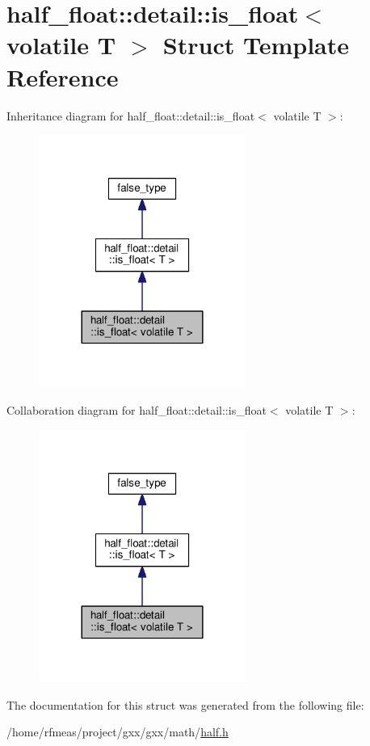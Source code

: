 \hypertarget{structhalf__float_1_1detail_1_1is__float_3_01volatile_01T_01_4}{}\section{half\+\_\+float\+:\+:detail\+:\+:is\+\_\+float$<$ volatile T $>$ Struct Template Reference}
\label{structhalf__float_1_1detail_1_1is__float_3_01volatile_01T_01_4}


Inheritance diagram for half\+\_\+float\+:\+:detail\+:\+:is\+\_\+float$<$ volatile T $>$\+:
\nopagebreak
\begin{figure}[H]
\begin{center}
\leavevmode
\includegraphics[width=192pt]{structhalf__float_1_1detail_1_1is__float_3_01volatile_01T_01_4__inherit__graph}
\end{center}
\end{figure}


Collaboration diagram for half\+\_\+float\+:\+:detail\+:\+:is\+\_\+float$<$ volatile T $>$\+:
\nopagebreak
\begin{figure}[H]
\begin{center}
\leavevmode
\includegraphics[width=192pt]{structhalf__float_1_1detail_1_1is__float_3_01volatile_01T_01_4__coll__graph}
\end{center}
\end{figure}


The documentation for this struct was generated from the following file\+:\begin{DoxyCompactItemize}
\item 
/home/rfmeas/project/gxx/gxx/math/\hyperlink{half_8h}{half.\+h}\end{DoxyCompactItemize}
